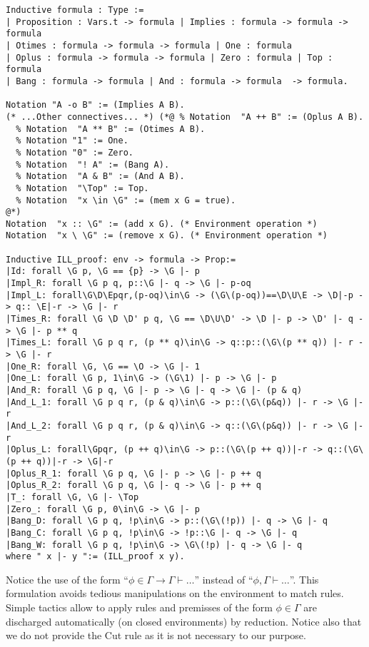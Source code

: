 \documentclass[runningheads,a4paper]{llncs}
\begin{document}
\begin{lstlisting}
Inductive formula : Type := 
| Proposition : Vars.t -> formula | Implies : formula -> formula -> formula 
| Otimes : formula -> formula -> formula | One : formula 
| Oplus : formula -> formula -> formula | Zero : formula | Top : formula
| Bang : formula -> formula | And : formula -> formula  -> formula.

Notation "A -o B" := (Implies A B).
(* ...Other connectives... *) (*@ % Notation  "A ++ B" := (Oplus A B).
  % Notation  "A ** B" := (Otimes A B).
  % Notation "1" := One.
  % Notation "0" := Zero.
  % Notation  "! A" := (Bang A).
  % Notation  "A & B" := (And A B).
  % Notation  "\Top" := Top.
  % Notation  "x \in \G" := (mem x G = true).
@*)
Notation  "x :: \G" := (add x G). (* Environment operation *)
Notation  "x \ \G" := (remove x G). (* Environment operation *)
 
Inductive ILL_proof: env -> formula -> Prop:=
|Id: forall \G p, \G == {p} -> \G |- p
|Impl_R: forall \G p q, p::\G |- q -> \G |- p-oq
|Impl_L: forall\G\D\Epqr,(p-oq)\in\G -> (\G\(p-oq))==\D\U\E -> \D|-p -> q:: \E|-r -> \G |- r
|Times_R: forall \G \D \D' p q, \G == \D\U\D' -> \D |- p -> \D' |- q -> \G |- p ** q
|Times_L: forall \G p q r, (p ** q)\in\G -> q::p::(\G\(p ** q)) |- r -> \G |- r
|One_R: forall \G, \G == \O -> \G |- 1
|One_L: forall \G p, 1\in\G -> (\G\1) |- p -> \G |- p
|And_R: forall \G p q, \G |- p -> \G |- q -> \G |- (p & q)
|And_L_1: forall \G p q r, (p & q)\in\G -> p::(\G\(p&q)) |- r -> \G |- r
|And_L_2: forall \G p q r, (p & q)\in\G -> q::(\G\(p&q)) |- r -> \G |- r
|Oplus_L: forall\Gpqr, (p ++ q)\in\G -> p::(\G\(p ++ q))|-r -> q::(\G\(p ++ q))|-r -> \G|-r
|Oplus_R_1: forall \G p q, \G |- p -> \G |- p ++ q
|Oplus_R_2: forall \G p q, \G |- q -> \G |- p ++ q 
|T_: forall \G, \G |- \Top
|Zero_: forall \G p, 0\in\G -> \G |- p
|Bang_D: forall \G p q, !p\in\G -> p::(\G\(!p)) |- q -> \G |- q
|Bang_C: forall \G p q, !p\in\G -> !p::\G |- q -> \G |- q
|Bang_W: forall \G p q, !p\in\G -> \G\(!p) |- q -> \G |- q
where " x |- y ":= (ILL_proof x y).
\end{lstlisting}


Notice the use of the form ``$\phi\in\Gamma \to \Gamma\vdash\dots$''
instead of ``$\phi,\Gamma\vdash\dots$''. This formulation avoids
tedious manipulations on the environment to match rules. Simple
tactics allow to apply rules and premisses of the form $\phi\in\Gamma$
are discharged automatically (on closed environments) by reduction.
Notice also that we do not provide the Cut rule as it is not necessary
to our purpose.
\end{document}
